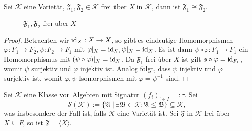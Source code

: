 \begin{proposition}
    Sei $\mathcal{K}$ eine Varietät, $\mathfrak{F}_1, \mathfrak{F}_2 \in \mathcal{K}$ frei über $X$ in $\mathcal{K}$, dann ist $\mathfrak{F}_1 \cong \mathfrak{F}_2$.
\end{proposition}

\begin{figure}[H]
    \centering
    \caption{$\mathfrak{F}_1, \mathfrak{F}_2$ frei über $X$}
\end{figure}

\begin{proof}
    Betrachten wir $\operatorname{id}_X : X \to X$, so gibt es eindeutige Homomorphismen $\varphi : F_1 \to F_2, \psi : F_2 \to F_1$ mit $\varphi \vert_X = \operatorname{id}_X, \psi \vert_X = \operatorname{id}_X$. Es ist dann $\psi \circ \varphi : F_1 \to F_1$ ein Homomorphismus mit $(\psi \circ \varphi) \vert_X = \operatorname{id}_X$. Da $\mathfrak{F}_1$ frei über $X$ ist gilt $\phi \circ \varphi = \operatorname{id}_{F_1}$, womit $\psi$ surjektiv und $\varphi$ injektiv ist. Analog folgt, dass $\psi$ injektiv und $\varphi$ surjektiv ist, womit $\varphi, \psi$ Isomorphismen mit $\varphi = \psi^{-1}$ sind.
\end{proof}


\begin{proposition}
    Sei $\mathcal{K}$ eine Klasse von Algebren mit Signatur $(f_i)_{i \in I} =: \tau$. Sei
    $$ \mathcal{S}(\mathcal{K}) := \{ \mathfrak{A} \mid \exists \mathfrak{B} \in \mathcal{K}: \mathfrak{A} \leq \mathfrak{B} \} \subseteq \mathcal{K}, $$
    was insbesondere der Fall ist, falls $\mathcal{K}$ eine Varietät ist. Sei $\mathfrak{F}$ in $\mathcal{K}$ frei über $X \subseteq F$, so ist $\mathfrak{F} = \langle X \rangle$.
\end{proposition}

